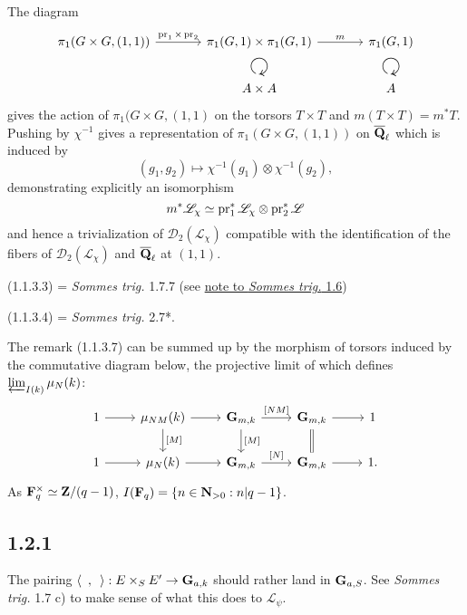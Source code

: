 \documentclass[deligne.tex]{subfiles}
\begin{document}
The diagram
\begin{equation*}\begin{tikzcd}[column sep=large,row sep=0]
	\pi_1(G\times G,(1,1))\arrow[r,"\pr_1\times\pr_2"]&\pi_1(G,1)\times\pi_1(G,1)\arrow[r,"m"]&\pi_1(G,1) \\ &\scalebox{2}{\rotatebox[origin=c]{-180}{$\circlearrowright$}} &\scalebox{2}{\rotatebox[origin=c]{-180}{$\circlearrowright$}} \\
	&A\times A&A
\end{tikzcd}\end{equation*}
gives the action of $\pi_1(G\times G,(1,1)$ on the torsors $T\times T$ and
$m(T\times T)=m^*T$. Pushing by $\chi^{-1}$ gives a representation of
$\pi_1(G\times G,(1,1))$ on $\overline{\mathbf{Q}}_\ell$ which is induced by
\begin{equation*}
	(g_1,g_2)\mapsto\chi^{-1}(g_1)\otimes\chi^{-1}(g_2),
\end{equation*}
demonstrating explicitly an isomorphism
\begin{equation*}
	m^*\mathscr L_\chi\simeq\operatorname{pr}_1^*\mathscr L_\chi\otimes\operatorname{pr}_2^*\mathscr L
\end{equation*}
and hence a trivialization of $\mathscr D_2(\mathscr L_\chi)$ compatible
with the identification of the fibers of $\mathscr D_2(\mathscr L_\chi)$
and $\overline{\mathbf{Q}}_\ell$ at $(1,1)$.

(1.1.3.3) = \emph{Sommes trig.} 1.7.7
(see \hyperref[sommes:1.6]{note to \emph{Sommes trig.} 1.6})

(1.1.3.4) = \emph{Sommes trig.} 2.7*.

The remark (1.1.3.7) can be summed up by the morphism of torsors induced by
the commutative diagram below, the projective limit of which defines
$\varprojlim_{I(k)}\mathbf{\mu}_N(k)$:
\begin{equation*}\begin{tikzcd}
	1\arrow[r]&\mu_{NM}(k)\arrow[r]\arrow[d,"{[M]}"]&\GG_{m,k}\arrow[r,"{[NM]}"]\arrow[d,"{[M]}"]&\GG_{m,k}\arrow[r]\arrow[d,equals]&1 \\
	1\arrow[r]&\mu_{N}(k)\arrow[r]&\GG_{m,k}\arrow[r,"{[N]}"]&\GG_{m,k}\arrow[r]&1.
\end{tikzcd}\end{equation*}
As $\mathbf{F}_q^\times\simeq\mathbf{Z}/(q-1)$, $I(\mathbf{F}_q)=\{n\in\mathbf{N}_{>0}:n|q-1\}$.

\subsection*{1.2.1}
The pairing $\langle\enskip,\enskip\rangle:E\times_SE'\rightarrow\mathbf{G}_{a,k}$ should
rather land in $\mathbf{G}_{a,S}$. See \emph{Sommes trig.} 1.7 c) to make sense of
what this does to $\mathscr L_{\psi}$.
\end{document}
